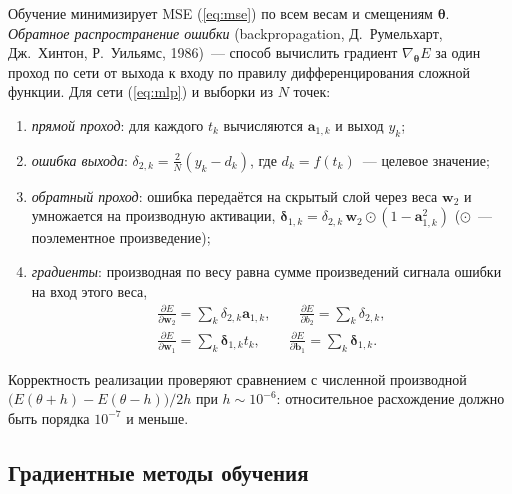 Обучение минимизирует MSE (\ref{eq:mse}) по всем весам и смещениям $\boldsymbol\theta$.
\emph{Обратное распространение ошибки} (backpropagation, Д.~Румельхарт, Дж.~Хинтон, Р.~Уильямс, 1986)~---
способ вычислить градиент $\nabla_{\boldsymbol\theta}E$ за один проход по сети от выхода к входу по правилу
дифференцирования сложной функции. Для сети (\ref{eq:mlp}) и выборки из $N$ точек:
\begin{enumerate}
\item \emph{прямой проход}: для каждого $t_k$ вычисляются $\mathbf{a}_{1,k}$ и выход $y_k$;
\item \emph{ошибка выхода}: $\delta_{2,k} = \frac{2}{N}(y_k - d_k)$, где $d_k = f(t_k)$~--- целевое значение;
\item \emph{обратный проход}: ошибка передаётся на скрытый слой через веса $\mathbf{w}_2$ и умножается на
производную активации, $\boldsymbol\delta_{1,k} = \delta_{2,k}\,\mathbf{w}_2 \odot (1 - \mathbf{a}_{1,k}^2)$
($\odot$~--- поэлементное произведение);
\item \emph{градиенты}: производная по весу равна сумме произведений сигнала ошибки на вход этого веса,
\begin{equation}
\begin{gathered}
\frac{\partial E}{\partial \mathbf{w}_2} = \sum_k \delta_{2,k}\mathbf{a}_{1,k}, \qquad
\frac{\partial E}{\partial b_2} = \sum_k \delta_{2,k}, \\
\frac{\partial E}{\partial \mathbf{w}_1} = \sum_k \boldsymbol\delta_{1,k} t_k, \qquad
\frac{\partial E}{\partial \mathbf{b}_1} = \sum_k \boldsymbol\delta_{1,k}.
\end{gathered}
\end{equation}
\end{enumerate}
Корректность реализации проверяют сравнением с численной производной
$\bigl(E(\theta + h) - E(\theta - h)\bigr)/2h$ при $h \sim 10^{-6}$: относительное расхождение должно
быть порядка $10^{-7}$ и меньше.

\subsection{Градиентные методы обучения}


